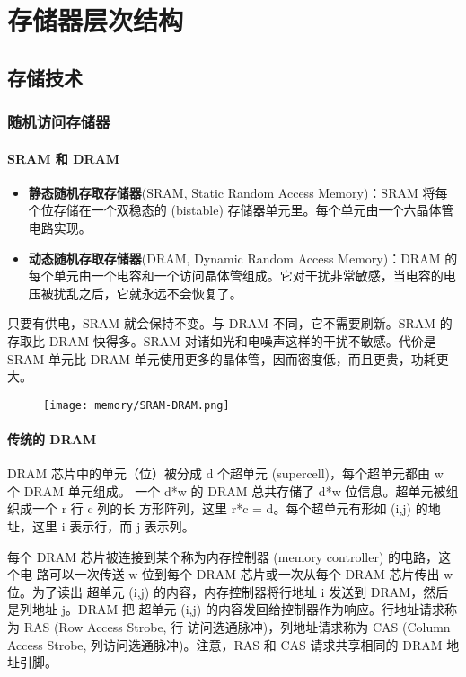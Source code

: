 \section{存储器层次结构}
\subsection{存储技术}
\subsubsection{随机访问存储器}

\paragraph{SRAM 和 DRAM}
\begin{itemize}
    \item \textbf{静态随机存取存储器}(SRAM, Static Random Access Memory)：SRAM 将每个位存储在一个双稳态的 (bistable) 存储器单元里。每个单元由一个六晶体管电路实现。
    \item \textbf{动态随机存取存储器}(DRAM, Dynamic Random Access Memory)：DRAM 的每个单元由一个电容和一个访问晶体管组成。它对干扰非常敏感，当电容的电压被扰乱之后，它就永远不会恢复了。
\end{itemize}

只要有供电，SRAM 就会保持不变。与 DRAM 不同，它不需要刷新。SRAM 的存取比 DRAM 快得多。SRAM 对诸如光和电噪声这样的干扰不敏感。代价是 SRAM 单元比 DRAM 单元使用更多的晶体管，因而密度低，而且更贵，功耗更大。
\begin{figure}[H]
    \centering
    \texttt{[image: memory/SRAM-DRAM.png]}
\end{figure}

\paragraph{传统的 DRAM}

DRAM 芯片中的单元（位）被分成 d 个超单元 (supercell)，每个超单元都由 w 个 DRAM
单元组成。 一个 d*w 的 DRAM 总共存储了 d*w 位信息。超单元被组织成一个 r 行 c 列的长
方形阵列，这里 r*c = d。每个超单元有形如 (i,j) 的地址，这里 i 表示行，而 j 表示列。

每个 DRAM 芯片被连接到某个称为内存控制器 (memory controller) 的电路，这个电
路可以一次传送 w 位到每个 DRAM 芯片或一次从每个 DRAM 芯片传出 w 位。为了读出
超单元 (i,j) 的内容，内存控制器将行地址 i 发送到 DRAM，然后是列地址 j。DRAM 把
超单元 (i,j) 的内容发回给控制器作为响应。行地址请求称为 RAS (Row Access Strobe, 行
访问选通脉冲)，列地址请求称为 CAS (Column Access Strobe, 列访问选通脉冲)。注意，RAS
和 CAS 请求共享相同的 DRAM 地址引脚。

